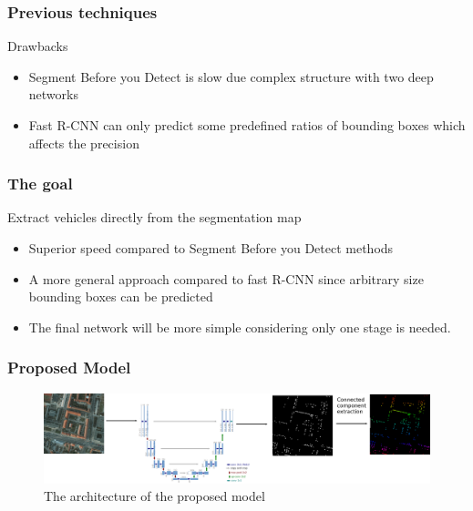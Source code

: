 \documentclass[aspectratio=1610]{beamer}
\begin{document}
\begin{frame}
  \frametitle{\hfill Previous techniques}
	  \begin{block}{Drawbacks}
    \begin{itemize}
    \item Segment Before you Detect is slow due complex structure with two deep networks
    \item Fast R-CNN can only predict some predefined ratios of bounding boxes which affects the precision
    \end{itemize}
  \end{block}
\end{frame}



\begin{frame}
  \frametitle{\hfill The goal}
	  \begin{block}{Extract vehicles directly from the segmentation map}
    \begin{itemize}
    \item Superior speed compared to Segment Before you Detect methods
    \item A more general approach compared to fast R-CNN since arbitrary size bounding boxes can be predicted
    \item The final network will be more simple considering only one stage is needed.
    \end{itemize}
  \end{block}
\end{frame}



\begin{frame}
  \frametitle{\hfill Proposed Model}
\begin{figure}[h!]
\centering
      \includegraphics[scale=0.15]{net}
\caption{The architecture of the proposed model}
\end{figure}
\end{frame}
\end{document}
